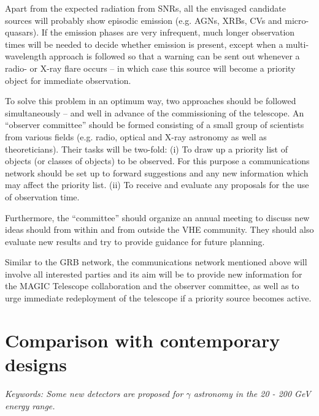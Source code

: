 Apart from the expected radiation from SNRs, all the envisaged candidate
sources will probably show episodic emission (e.g. AGNs, XRBs, CVs and
micro-quasars). If the emission phases are very infrequent, much longer
observation times will be needed to decide whether emission is present,
except when a multi-wavelength approach is followed so that a warning can be
sent out whenever a radio- or X-ray flare occurs -- in which case this
source will become a priority object for immediate observation.

To solve this problem in an optimum way, two approaches should be followed
simultaneously -- and well in advance of the commissioning of the telescope.
An ``observer committee'' should be formed consisting of a small group of
scientists from various fields (e.g. radio, optical and X-ray astronomy as
well as theoreticians). Their tasks will be two-fold: (i) To draw up a
priority list of objects (or classes of objects) to be observed. For this
purpose a communications network should be set up to forward suggestions and
any new information which may affect the priority list. (ii) To receive and
evaluate any proposals for the use of observation time.

Furthermore, the ``committee'' should organize an annual meeting to discuss
new ideas should from within and from outside the VHE community. They should
also evaluate new results and try to provide guidance for future planning.

Similar to the GRB network, the communications network mentioned above will
involve all interested parties and its aim will be to provide new
information for the MAGIC Telescope collaboration and the observer committee, as well as to urge
immediate redeployment of the telescope if a priority source becomes active.

\newpage

\hspace{3cm}
\vfill
\newpage
\begin{figure}[t]
\leavevmode
\centering
\epsfxsize=14cm
\end{figure}
\newpage

\setcounter{chapter}{9}

\chapter{Comparison with contemporary designs}

{\it Keywords: Some new detectors are proposed for $\gamma$
astronomy in the 20 - 200 GeV energy range.}

